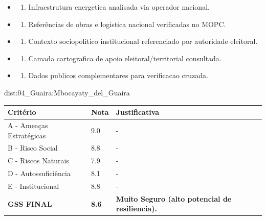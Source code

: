 {\begin{itemize}
\item
  \begin{enumerate}
  \def\labelenumi{\arabic{enumi})}
  \setcounter{enumi}{7}
  \tightlist
  \item
    Infraestrutura energetica analisada via operador nacional.
  \end{enumerate}
\item
  \begin{enumerate}
  \def\labelenumi{\arabic{enumi})}
  \setcounter{enumi}{8}
  \tightlist
  \item
    Referências de obras e logistica nacional verificadas no MOPC.
  \end{enumerate}
\item
  \begin{enumerate}
  \def\labelenumi{\arabic{enumi})}
  \setcounter{enumi}{9}
  \tightlist
  \item
    Contexto sociopolitico institucional referenciado por autoridade
    eleitoral.
  \end{enumerate}
\item
  \begin{enumerate}
  \def\labelenumi{\arabic{enumi})}
  \setcounter{enumi}{10}
  \tightlist
  \item
    Camada cartografica de apoio eleitoral/\allowbreak territorial consultada.
  \end{enumerate}
\item
  \begin{enumerate}
  \def\labelenumi{\arabic{enumi})}
  \setcounter{enumi}{11}
  \tightlist
  \item
    Dados publicos complementares para verificacao cruzada.
  \end{enumerate}
\end{itemize}}{dist:04_Guaira:Mbocayaty_del_Guaira}
\begin{table}[ht!]
\small \begin{tabular}{p{3.0cm}p{0.8cm}p{6.0cm}} \toprule
\textbf{Critério} & \textbf{Nota} & \textbf{Justificativa} \\ \midrule
A - Ameaças Estratégicas & 9.0 & - \\
B - Risco Social & 8.8 & - \\
C - Riscos Naturais & 7.9 & - \\
D - Autossuficiência & 8.1 & - \\
E - Institucional & 8.8 & - \\
\midrule \textbf{GSS FINAL} & \textbf{8.6} & \textbf{Muito Seguro (alto potencial de resiliencia).} \\ \bottomrule \end{tabular}
\end{table}
